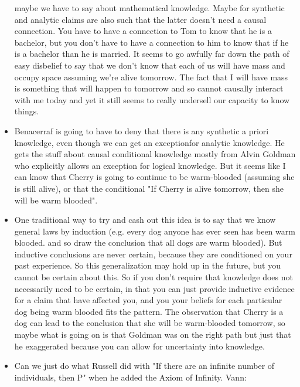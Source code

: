\documentclass[12pt]{article}
\theoremstyle{definition}
\begin{document}
\begin{itemize}
        maybe we have to say about mathematical knowledge. Maybe for synthetic
        and analytic claims are also such that the latter doesn't need a causal
        connection. You have to have a connection to Tom to know that he is a
        bachelor, but you don't have to have a connection to him to know that
        if he is a bachelor than he is married. It seems to go awfully far down
        the path of easy disbelief to say that we don't know that each of us
        will have mass and occupy space assuming we're alive tomorrow. The fact
        that I will have mass is something that will happen to tomorrow and so
        cannot causally interact with me today and yet it still seems to really
        undersell our capacity to know things. 
    \item
        Benacerraf is going to have to deny that there is any synthetic a
        priori knowledge, even though we can get an exceptionfor analytic
        knowledge. He gets the stuff about causal conditional knowledge mostly
        from Alvin Goldman who explicitly allows an exception for logical
        knowledge. But it seems like I can know that Cherry is going to
        continue to be warm-blooded (assuming she is still alive), or that the
        conditional "If Cherry is alive tomorrow, then she will be warm
        blooded".
    \item
        One traditional way to try and cash out this idea is to say that
        we know general laws by induction (e.g. every dog anyone has ever seen
        has been warm blooded. and so draw the conclusion that all dogs are
        warm blooded). But inductive conclusions are never certain, because
        they are conditioned on your past experience. So this generalization
        may hold up in the future, but you cannot be certain about this. So if
        you don't require that knowledge does not necessarily need to be
        certain, in that you can just provide inductive evidence for a claim
        that have affected you, and you your beliefs for each particular dog
        being warm blooded fits the pattern. The observation that Cherry is a
        dog can lead to the conclusion that she will be warm-blooded tomorrow,
        so maybe what is going on is that Goldman was on the right path but
        just that he exaggerated because you can allow for uncertainty into
        knowledge.
    \item
        Can we just do what Russell did with "If there are an infinite number
        of individuals, then P" when he added the Axiom of Infinity. Vann:

\end{itemize}
\end{document}
